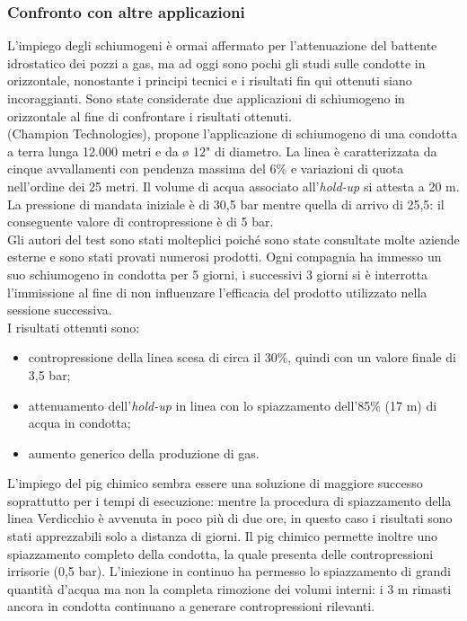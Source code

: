 \subsubsection*{Confronto con altre applicazioni}
L'impiego degli schiumogeni è ormai affermato per l'attenuazione del battente idrostatico dei pozzi a gas, ma ad oggi sono pochi gli studi sulle condotte in orizzontale, nonostante i principi tecnici e i risultati fin qui ottenuti siano incoraggianti. Sono state considerate due applicazioni di schiumogeno in orizzontale al fine di confrontare i risultati ottenuti.\\
\textcite{heuvel2011novel} (Champion Technologies), propone l'applicazione di schiumogeno di una condotta a terra lunga 12.000 metri e da ø 12" di diametro. La linea è caratterizzata da cinque avvallamenti con pendenza massima del 6\% e variazioni di quota nell'ordine dei 25 metri. Il volume di acqua associato all'\textit{hold-up} si attesta a 20 m. La pressione di mandata iniziale è di 30,5 bar mentre quella di arrivo di 25,5: il conseguente valore di contropressione è di 5 bar.\\
Gli autori del test sono stati molteplici poiché sono state consultate molte aziende esterne e sono stati provati numerosi prodotti. Ogni compagnia ha immesso un suo schiumogeno in condotta per 5 giorni, i successivi 3 giorni si è interrotta l'immissione al fine di non influenzare l'efficacia del prodotto utilizzato nella sessione successiva. \\
I risultati ottenuti sono:
\begin{itemize}
\item contropressione della linea scesa di circa il 30\%, quindi con un valore finale di 3,5 bar;
\item attenuamento dell'\textit{hold-up} in linea con lo spiazzamento dell'85\% (17 m) di acqua in condotta;
\item aumento generico della produzione di gas.
\end{itemize}
L'impiego del pig chimico sembra essere una soluzione di maggiore successo soprattutto per i tempi di esecuzione: mentre la procedura di spiazzamento della linea Verdicchio è avvenuta in poco più di due ore, in questo caso i risultati sono stati apprezzabili solo a distanza di giorni. Il pig chimico permette inoltre uno spiazzamento completo della condotta, la quale presenta delle contropressioni irrisorie (0,5 bar). L'iniezione in continuo ha permesso lo spiazzamento di grandi quantità d'acqua ma non la completa rimozione dei volumi interni: i 3 m rimasti ancora in condotta continuano a generare contropressioni rilevanti.\\
